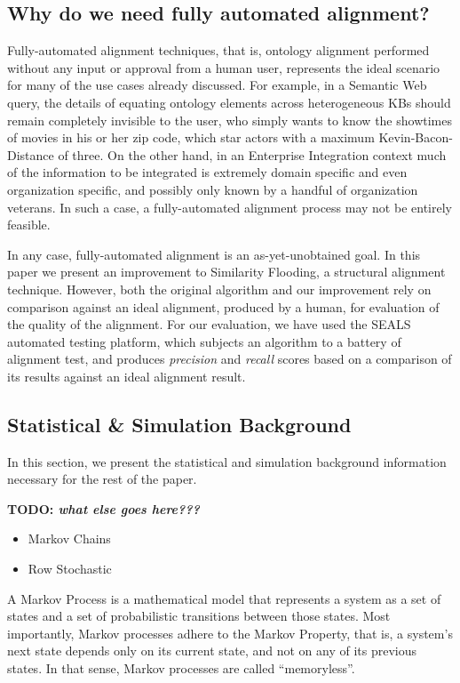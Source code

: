 \documentclass[letterpaper,twocolumn,12pt]{article}
\begin{document}
\subsection{Why do we need fully automated alignment?}
\label{subsec:automated}
Fully-automated alignment techniques, that is, ontology alignment performed without
any input or approval from a human user, represents the ideal scenario for many
of the use cases already discussed. For example, in a Semantic Web query, the details
of equating ontology elements across heterogeneous KBs should remain completely
invisible to the user, who simply wants to know the showtimes of movies in his or her
zip code, which star actors with a maximum Kevin-Bacon-Distance of three.
On the other hand, in an Enterprise Integration context much of the information to
be integrated is extremely domain specific and even organization specific, and possibly
only known by a handful of organization veterans. In such a case, a fully-automated
alignment process may not be entirely feasible.

In any case, fully-automated alignment is an as-yet-unobtained goal. In this paper
we present an improvement to Similarity Flooding, a structural alignment technique. However,
both the original algorithm and our improvement rely on comparison against an ideal
alignment, produced by a human, for evaluation of the quality of the alignment. For our
evaluation, we have used the SEALS automated testing platform, which subjects an algorithm
to a battery of alignment test, and produces \textit{precision} and \textit{recall} scores
based on a comparison of its results against an ideal alignment result.


\subsection{Statistical \& Simulation Background}
\label{subsec:stat}
In this section, we present the statistical and simulation background information
necessary for the rest of the paper.

\textbf{TODO: \textit{what else goes here???}}
\begin{itemize}
		\item Markov Chains
		\item Row Stochastic
\end{itemize}

A Markov Process is a mathematical model that represents a system as a set of states
and a set of probabilistic transitions between those states. Most importantly, Markov 
processes adhere to the Markov Property, that is, a system's next state depends only
on its current state, and not on any of its previous states. In that sense, Markov
processes are called ``memoryless''.
\end{document}
